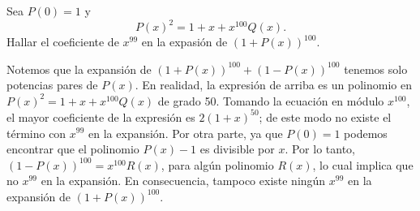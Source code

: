 \begin{example}
    Sea $P(0) = 1$ y
    \[
        P(x)^2 = 1 + x + x^{100} Q(x).
    \]
    Hallar el coeficiente de $x^{99}$ en la expasión de $\left(1 + P(x)\right)^{100}$.
\end{example}
\begin{solution}
    Notemos que la expansión de $\left(1 + P(x)\right)^{100} + \left(1 - P(x)\right)^{100}$ tenemos solo potencias pares de $P(x)$.
    En realidad, la expresión de arriba es un polinomio en $P(x)^2 = 1 + x + x^{100} Q(x)$ de grado 50.
    Tomando la ecuación en módulo $x^{100}$, el mayor coeficiente de la expresión es $2(1 + x)^{50}$; de este modo no existe el término con $x^{99}$ en la expansión.
    Por otra parte, ya que $P(0) = 1$ podemos encontrar que el polinomio $P(x) - 1$ es divisible por $x$.
    Por lo tanto, $\left(1 - P(x)\right)^{100} = x^{100} R(x)$, para algún polinomio $R(x)$, lo cual implica que no $x^{99}$ en la expansión.
    En consecuencia, tampoco existe ningún $x^{99}$ en la expansión de $\left(1 + P(x)\right)^{100}$.
\end{solution}


